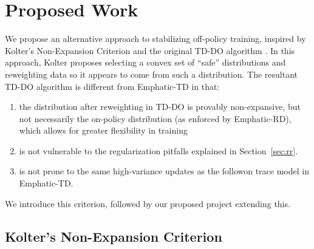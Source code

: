 \documentclass[11pt]{article}
\begin{document}

\section{Proposed Work}
We propose an alternative approach to stabilizing off-policy training, inspired by Kolter's Non-Expansion Criterion and the original TD-DO algorithm \cite{kolter2011fixed}. 
In this approach, Kolter proposes selecting a convex set of ``safe'' distributions and reweighting data so it appears to come from such a distribution. The resultant TD-DO algorithm is different from Emphatic-TD in that:
\begin{enumerate}
  \item the distribution after reweighting in TD-DO is provably non-expansive, but not necessarily the on-policy distribution (as enforced by Emphatic-RD), which allows for greater flexibility in training
  \item is not vulnerable to the regularization pitfalls explained in Section~\ref{sec:rr}.
  \item is not prone to the same high-variance updates as the followon trace model in Emphatic-TD.
\end{enumerate}
We introduce this criterion, followed by our proposed project extending this.

\subsection{Kolter's Non-Expansion Criterion }
\end{document}
